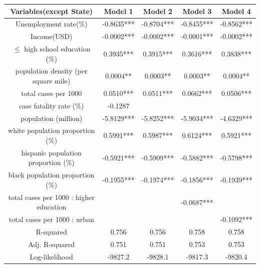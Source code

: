 \documentclass[12pt]{article}
\begin{document}
\begin{tabular}{ccccc}
	
	\hline
	 Variables(except State)& Model 1& Model 2&Model 3&Model 4\\
	\hline
	Unemployment rate(\%)& \small-0.8635***& \small-0.8704***& \small-0.8455*** &\small -0.8562***\\
	
	Income(USD)& \small-0.0002*** & \small-0.0002***& \small-0.0001*** &\small-0.0002***\\
	
	$\leq$ high school education (\%)& \small0.3935***& \small0.3915*** &\small0.3616*** & \small0.3838***\\
	
	population density (per square mile)& \small0.0004**& \small0.0003** & \small0.0003** & \small 0.0004**\\
	
	total cases per 1000& \small0.0510***& \small0.0511*** & \small0.0662*** & \small0.0506***\\
	
	case fatality rate (\%)& \small-0.1287&\\
	
	population (million)& \small-5.8129***&\small-5.8252*** & \small-5.9034*** & \small -4.6329***\\
	
	white population proportion (\%) & \small0.5991***& \small0.5987*** & \small0.6124*** & \small 0.5921***\\
	
	hispanic population proportion (\%)& \small-0.5921***& \small-0.5909*** & \small -0.5882*** & \small-0.5798***\\
	
	black population proportion (\%)& \small-0.1955*** & \small-0.1974*** & \small-0.1856*** & \small -0.1939***\\
	
	total cases per 1000 : higher education & & & \small -0.0687***\\
	
	total cases per 1000 : urban & & & & \small -0.1092***\\
	
	\hline 
	R-squared & 0.756& 0.756& 0.758 & 0.758\\
	Adj. R-squared & 0.751& 0.751& 0.753& 0.753\\
	Log-likelihood & -9827.2& -9828.1& -9817.3 & -9820.4\\
	\hline
	
\end{tabular} \\
\end{document}

